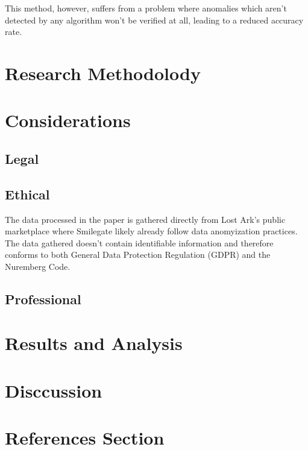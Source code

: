 \documentclass[journal]{IEEEtran}
\begin{document}
This method, however, suffers from a problem where anomalies which aren't detected by any algorithm won't be verified at all, leading to a reduced accuracy rate.

\section{Research Methodolody}

\section{Considerations}
\subsection{Legal}

\subsection{Ethical}
\noindent The data processed in the paper is gathered directly from Lost Ark's public marketplace where Smilegate likely already follow data anomyization practices\cite{Gruschka2018}. The data gathered doesn't contain identifiable information and therefore conforms to both General Data Protection Regulation (GDPR) and the Nuremberg Code\cite{Nuremberg1947}.

\subsection{Professional}

\section{Results and Analysis}

\section{Disccussion}

\section{References Section}
\printbibliography
\end{document}
